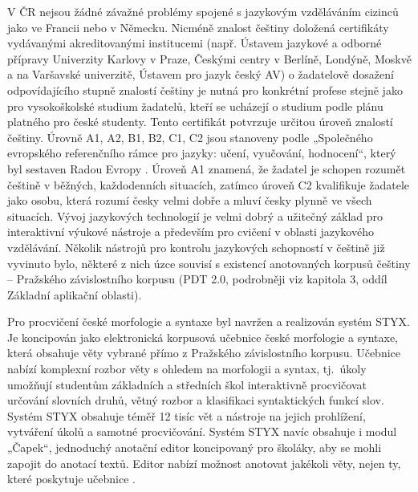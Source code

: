 \begin{multicols}{2}
V ČR nejsou žádné závažné problémy spojené s jazykovým vzděláváním cizinců jako ve Francii nebo v Německu. Nicméně znalost češtiny doložená certifikáty vydávanými akreditovanými institucemi (např. Ústavem jazykové a odborné přípravy Univerzity Karlovy v Praze, Českými centry v Berlíně, Londýně, Moskvě a na Varšavské univerzitě, Ústavem pro jazyk český AV) o žadatelově dosažení odpovídajícího stupně znalostí češtiny je nutná pro konkrétní profese stejně jako pro vysokoškolské studium žadatelů, kteří se ucházejí o studium podle plánu platného pro české studenty. Tento certifikát potvrzuje určitou úroveň znalostí češtiny. Úrovně A1, A2, B1, B2, C1, C2 jsou stanoveny podle „Společného evropského referenčního rámce pro jazyky: učení, vyučování, hodnocení“, který byl sestaven Radou Evropy \cite{Note7}. Úroveň A1 znamená, že žadatel je schopen rozumět češtině v běžných, každodenních situacích, zatímco úroveň C2 kvalifikuje žadatele jako osobu, která rozumí česky velmi dobře a mluví česky plynně ve všech situacích. Vývoj jazykových technologií je velmi dobrý a užitečný základ pro interaktivní výukové nástroje a především pro cvičení v oblasti jazykového vzdělávání. Několik nástrojů pro kontrolu jazykových schopností v češtině již vyvinuto bylo, některé z nich úzce souvisí s existencí anotovaných korpusů češtiny – Pražského závislostního korpusu (PDT 2.0, podrobněji viz kapitola 3, oddíl Základní aplikační oblasti).

Pro procvičení české morfologie a syntaxe byl navržen a realizován systém STYX. Je koncipován jako elektronická korpusová učebnice české morfologie a syntaxe, která obsahuje věty vybrané přímo z Pražského závislostního korpusu. Učebnice nabízí komplexní rozbor věty s ohledem na morfologii a syntax, tj.~úkoly umožňují studentům základních a středních škol interaktivně procvičovat určování slovních druhů, větný rozbor a klasifikaci syntaktických funkcí slov. Systém STYX obsahuje téměř 12 tisíc vět a nástroje na jejich prohlížení, vytváření úkolů a samotné procvičování. Systém STYX navíc obsahuje i  modul „Čapek“, jednoduchý anotační editor koncipovaný pro školáky, aby se mohli zapojit do anotací textů. Editor nabízí možnost anotovat jakékoli věty, nejen ty, které poskytuje učebnice \cite{Note8}.


\end{multicols}
